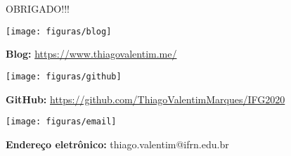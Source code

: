 \documentclass[xcolor=table,t]{beamer}
\begin{document}
\begin{frame}[c]{OBRIGADO!!!}
\hspace{-1.5 cm}\begin{minipage}[c]{3.0 cm}
	\centering
	\texttt{[image: figuras/blog]} 
\end{minipage}
\begin{minipage}[r]{8 cm}
	\footnotesize \textbf{Blog:} \href{https://www.thiagovalentim.me/}{https://www.thiagovalentim.me/} 
\end{minipage}
\vspace{0.4 cm}

\hspace{-1.5 cm}\begin{minipage}[c]{3.0 cm}
	\centering
	\texttt{[image: figuras/github]} 
\end{minipage}
\begin{minipage}[r]{8 cm}
	\footnotesize \textbf{GitHub:} \href{https://github.com/ThiagoValentimMarques/IFG2020}{https://github.com/ThiagoValentimMarques/IFG2020} 
\end{minipage}
\vspace{0.5 cm}

\hspace{-1.5 cm}\begin{minipage}[c]{3.0 cm}
	\centering
	\texttt{[image: figuras/email]} 
\end{minipage}
\begin{minipage}[r]{8 cm}
	\footnotesize \textbf{Endereço eletrônico:} thiago.valentim@ifrn.edu.br
\end{minipage}

\end{frame}


\begin{frame}
\maketitle
\end{frame}
\end{document}
